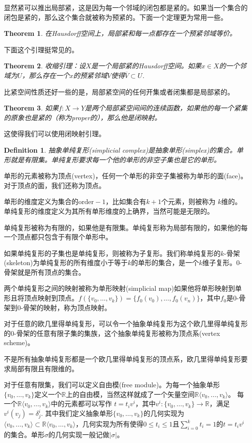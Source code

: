 \documentclass[10pt]{book}
\theoremstyle{plain}%
\newtheorem{theo}{Theorem}%
\newtheorem{defi}{Definition}%
\begin{document}
显然紧可以推出局部紧，这是因为每一个邻域的闭包都是紧的。如果当一个集合的闭包是紧的，那么这个集合就被称为预紧的。下面一个定理更为常用一些。

\begin{theo}
在Hausdorff空间上，局部紧和每一点都存在一个预紧邻域等价。
\end{theo}
下面这个引理挺常见的。
\begin{theo}
收缩引理：设$X$是一个局部紧的Hausdorff空间。如果$x\in X$的一个邻域为$U$，那么存在一个$x$的预紧邻域$V$使得$\overline{V}\subset U$.
\end{theo}
比紧空间性质还好一些的是，局部紧空间的任何开集或者闭集都是局部紧的。
\begin{theo}
如果$f:X\to Y$是两个局部紧空间间的连续函数，如果他的每一个紧集的原象也是紧的（称为proper的），那么他是闭映射。
\end{theo}
这使得我们可以使用闭映射引理。
\begin{defi}
抽象单纯复形(simplicial complex)是抽象单形(simplex)的集合。单形就是有限集。单纯复形要求每一个他的单形的非空子集也是它的单形。
\end{defi}
单形的元素被称为顶点(vertex)，任何一个单形的非空子集被称为单形的面(face)。对于顶点的面，我们还称为顶点。

单形的维度定义为集合的$\mathrm{order}-1$，比如集合有$k+1$个元素，则被称为
$k$维的。
单纯复形的维度定义为其所有单形维度的上确界，当然可能是无限的。

单纯复形被称为有限的，如果他是有限集。单纯复形称为局部有限的，如果他的每一个顶点都只包含于有限个单形中。

如果单纯复形的子集也是单纯复形，则被称为子复形。我们称单纯复形的$k$-骨架(skeleton)为单纯复形的所有维度小于等于$k$的单形的集合，是一个$k$维子复形。0-骨架就是所有顶点的集合。

两个单纯复形之间的映射被称为单形映射(simplicial map)如果他将单形映射到单形且将顶点映射到顶点。$f(\{v_0,\dots,v_k\})=\{f_0(v_0),\dots,f_0(v_n)\}$，其中$f_0$是0-骨架到0-骨架的映射，称为顶点映射。

对于任意的欧几里得单纯复形，可以令一个抽象单纯复形为这个欧几里得单纯复形的0-骨架的任意有限子集的集族，这个抽象单纯复形被称为顶点系(vertex scheme)。

不是所有抽象单纯复形都是一个欧几里得单纯复形的顶点系，欧几里得单纯复形要求局部有限且有限维的。

对于任意有限集，我们可以定义自由模(free module)。为每一个抽象单形$\{v_0,\dots,v_k\}$定义一个$\mathbb{R}$上的自由模，当然这样就成了一个矢量空间$\mathbb{R}\langle v_0,\dots,v_k\rangle$。
每一个$\mathbb{R}\langle v_0,\dots,v_k\rangle$中的元素都可以写作
$t=t_iv^i$，其中$v^i:\{v_0,\dots,v_k\}\to\mathbb{R}$，满足$v^i(v_j)=\delta_j^i$.
其中我们定义抽象单形$\{v_0,\dots,v_k\}$的几何实现为$\langle v_0,\dots,v_k\rangle\subset \mathbb{R}\langle v_0,\dots,v_k\rangle$，几何实现为所有使得$0\leq t_i\leq 1$且$\sum_{i=0}^kt_i=1$的$t=t_iv^i$的集合。单形$\sigma$的几何实现一般记做$|\sigma|$。
\end{document}
